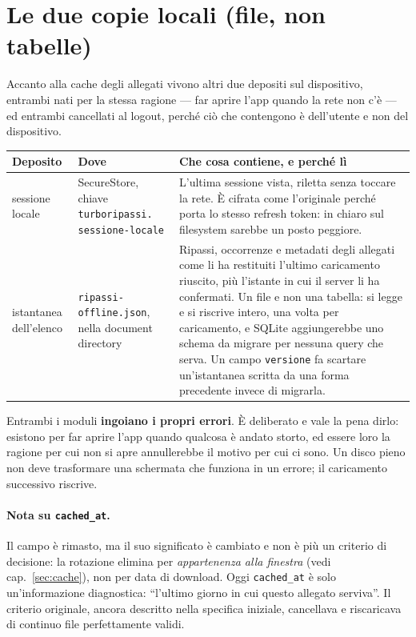 \documentclass[11pt,a4paper]{report}
\begin{document}
\section{Le due copie locali (file, non tabelle)}
\label{sec:copielocali}

Accanto alla cache degli allegati vivono altri due depositi sul dispositivo,
entrambi nati per la stessa ragione --- far aprire l'app quando la rete non
c'\`e --- ed entrambi cancellati al logout, perch\'e ci\`o che contengono \`e
dell'utente e non del dispositivo.

\begin{center}
\small
\begin{tabular}{@{}p{3.6cm}p{3.0cm}p{7.9cm}@{}}
\toprule
\textbf{Deposito} & \textbf{Dove} & \textbf{Che cosa contiene, e perch\'e l\`i} \\
\midrule
sessione locale &
  SecureStore, chiave \texttt{turboripassi.} \texttt{sessione-locale} &
  L'ultima sessione vista, riletta senza toccare la rete. \`E cifrata come
  l'originale perch\'e porta lo stesso refresh token: in chiaro sul filesystem
  sarebbe un posto peggiore. \\
\addlinespace
istantanea dell'elenco &
  \texttt{ripassi-} \texttt{offline.json}, nella document directory &
  Ripassi, occorrenze e metadati degli allegati come li ha restituiti
  l'ultimo caricamento riuscito, pi\`u l'istante in cui il server li ha
  confermati. Un file e non una tabella: si legge e si riscrive intero, una
  volta per caricamento, e SQLite aggiungerebbe uno schema da migrare per
  nessuna query che serva. Un campo \texttt{versione} fa scartare
  un'istantanea scritta da una forma precedente invece di migrarla. \\
\bottomrule
\end{tabular}
\end{center}

Entrambi i moduli \textbf{ingoiano i propri errori}. \`E deliberato e vale la
pena dirlo: esistono per far aprire l'app quando qualcosa \`e andato storto, ed
essere loro la ragione per cui non si apre annullerebbe il motivo per cui ci
sono. Un disco pieno non deve trasformare una schermata che funziona in un
errore; il caricamento successivo riscrive.

\paragraph{Nota su \texttt{cached\_at}.} Il campo \`e rimasto, ma il suo
significato \`e cambiato e non \`e pi\`u un criterio di decisione: la
rotazione elimina per \emph{appartenenza alla finestra} (vedi cap.~\ref{sec:cache}), non per
data di download. Oggi \texttt{cached\_at} \`e solo un'informazione
diagnostica: ``l'ultimo giorno in cui questo allegato serviva''. Il criterio
originale, ancora descritto nella specifica iniziale, cancellava e
riscaricava di continuo file perfettamente validi.
\end{document}
